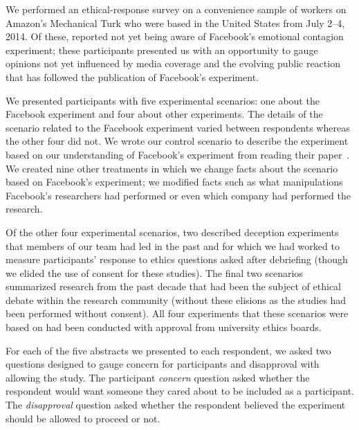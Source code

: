 We performed an ethical-response survey on a convenience sample of  workers on Amazon's Mechanical Turk who were based in the United States from July 2--4, 2014.  Of these,  reported not yet being aware of Facebook's emotional contagion experiment; these participants presented us with an opportunity to gauge opinions not yet influenced by media coverage and the evolving public reaction that has followed the publication of Facebook's experiment.

We presented participants with five experimental scenarios: one about the Facebook experiment and four about other experiments.  The details of the scenario related to the Facebook experiment varied between respondents whereas the other four did not.  We wrote our control scenario to describe the experiment based on our understanding of Facebook's experiment from reading their paper~\cite{Kramer2014:SocialContagion}.  We created nine other treatments in which we change facts about the scenario based on Facebook's experiment; we modified facts such as what manipulations Facebook's researchers had performed or even which company had performed the research.

Of the other four experimental scenarios, two described deception experiments that members of our team had led in the past and for which we had worked to measure participants' response to ethics questions asked after debriefing (though we elided the use of consent for these studies).  The final two scenarios summarized research from the past decade that had been the subject of ethical debate within the research community (without these elisions as the studies had been performed without consent).  All four experiments that these scenarios were based on had been conducted with approval from university ethics boards.

For each of the five abstracts we presented to each respondent, we asked two questions designed to gauge concern for participants and disapproval with allowing the study.  The participant \emph{concern} question asked whether the respondent would want someone they cared about to be included as a participant.  The \emph{disapproval} question asked whether the respondent believed the experiment should be allowed to proceed or not.

